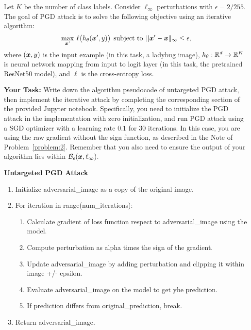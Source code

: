 \documentclass[11pt]{article}
\begin{document}
\begin{problem}[10 pts]
\label{problem:3}
\rm
Let $K$ be the number of class labels. Consider $\ell_\infty$ perturbations with $\epsilon=2/255$. The goal of PGD attack is to solve the following objective using an iterative algorithm:
\begin{align*}
    \max_{\bm{x}'}\:\ell\big(h_\theta(\bm{x}', y)\big) \:\: \text{subject to} \:\: \|\bm{x}' - \bm{x}\|_\infty \leq \epsilon,
\end{align*}
where $(\bm{x},y)$ is the input example (in this task, a ladybug image), $h_\theta:\mathbb{R}^d\rightarrow\mathbb{R}^K$ is neural network mapping from input to logit layer (in this task, the pretrained ResNet50 model), and $\ell$ is the cross-entropy loss.

\textbf{Your Task:} Write down the algorithm pseudocode of untargeted PGD attack, then implement the iterative attack by completing the corresponding section of the provided Jupyter notebook. Specifically, you need to initialize the PGD attack in the implementation with zero initialization, and run PGD attack using a SGD optimizer with a learning rate $0.1$ for $30$ iterations. In this case, you are using the raw gradient without the sign function, as described in the Note of Problem~\ref{problem:2}. Remember that you also need to ensure the output of your algorithm lies within $\mathcal{B}_\epsilon(\bm{x}, \ell_\infty)$.
\end{problem}


\textbf{Untargeted PGD Attack}
\begin{enumerate}
    \item Initialize adversarial\_image as a copy of the original image.
    \item For iteration in range(num\_iterations):
    \begin{enumerate}
        \item Calculate gradient of loss function respect to adversarial\_image using the model.
        \item Compute perturbation as alpha times the sign of the gradient.
        \item Update adversarial\_image by adding perturbation and clipping it within image +/- epsilon.
        \item Evaluate adversarial\_image on the model to get yhe prediction.
        \item If prediction differs from original\_prediction, break.
    \end{enumerate}
    \item Return adversarial\_image.
\end{enumerate}
\end{document}
